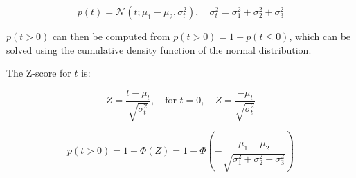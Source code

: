 \[
p(t) = \mathcal{N}(t; \mu_1 - \mu_2, \sigma_t^2), \quad \sigma_t^2 = \sigma_1^2 + \sigma_2^2 + \sigma_3^2
\]

$p(t > 0)$ can then be computed from $p(t > 0) = 1 - p(t \leq 0)$, which can be solved using the cumulative density function of the normal distribution.

The Z-score for $t$ is:

\[
Z = \frac{t - \mu_t}{\sqrt{\sigma_t^2}}, \quad \text{for } t = 0, \quad Z = \frac{-\mu_t}{\sqrt{\sigma_t^2}}
\]

\[
p(t > 0) = 1 - \Phi(Z) = 1 - \Phi\left( -\frac{\mu_1 - \mu_2}{\sqrt{\sigma_1^2 + \sigma_2^2 + \sigma_3^2}} \right)
\]


